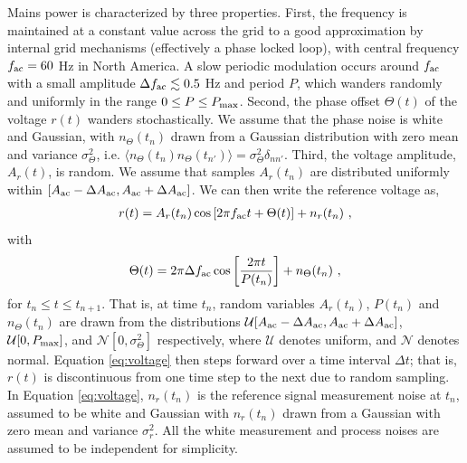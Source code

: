 \documentclass[pra,superscriptaddress,reprint,amsmath,amssymb,nofootinbib]{revtex4-2}
\begin{document}
 
 Mains power is characterized by three properties. First, the frequency is maintained at a constant value across the grid to a good approximation by internal grid mechanisms (effectively a phase locked loop), with central frequency $f_{\rm ac} = 60$ Hz in North America. A slow periodic modulation occurs around $f_{\rm ac}$ with a small amplitude $\Delta f_{\rm ac} \lesssim 0.5$ Hz and period $P$, which wanders randomly and uniformly in the range $0 \leq P \leq P_{\rm max}$. Second, the phase offset $\Theta(t)$ of the voltage $r(t)$ wanders stochastically. We assume that the phase noise is white and Gaussian, with $n_{\Theta}(t_n)$ drawn from a Gaussian distribution with zero mean and variance $\sigma_{\Theta}^2$, i.e. $\langle n_{\Theta} (t_n) n_{\Theta} (t_{n'})\rangle = \sigma^2_{\Theta} \delta_{n n'}$. Third, the voltage amplitude, $A_r(t)$, is random. We assume that samples $A_r(t_n)$ are distributed uniformly within $[A_{\rm ac} - \Delta A_{\rm ac} , A_{\rm ac} + \Delta A_{\rm ac}]$. We can then write the reference voltage as,
 \begin{eqnarray}
 	r(t) = A_r(t_n) \cos \left[ 2 \pi f_{\rm ac} t + \Theta(t)\right] +n_r(t_n) \ ,
 	\label{eq:voltage}
 \end{eqnarray}
with
 \begin{eqnarray}
\Theta(t) = 2 \pi \Delta f_{\rm ac} \cos\left[\frac{2 \pi t}{P(t_n)}\right] + n_{\Theta} (t_n) \ ,
\label{eq:voltage_theta}
\end{eqnarray}
for $t_n \leq t \leq t_{n+1}$. That is, at time $t_n$, random variables $A_r(t_n)$, $P(t_n)$ and $n_{\Theta} (t_n)$ are drawn from the distributions $\mathcal{U}[A_{\rm ac} - \Delta A_{\rm ac},A_{\rm ac} + \Delta A_{\rm ac} ]$, $\mathcal{U}[0, P_{\rm max}]$, and $\mathcal{N} [0, \sigma_{\Theta}^2]$ respectively, where $\mathcal{U}$ denotes uniform, and $\mathcal{N}$ denotes normal. Equation \eqref{eq:voltage} then steps forward over a time interval $\Delta t$; that is, $r(t)$ is discontinuous from one time step to the next due to random sampling. In Equation \eqref{eq:voltage}, $n_r(t_n)$ is the reference signal measurement noise at $t_n$, assumed to be white and Gaussian with $n_r(t_n)$ drawn from a Gaussian with zero mean and variance $\sigma_r^2$. All the white measurement and process noises are assumed to be independent for simplicity. \newline 
\end{document}
